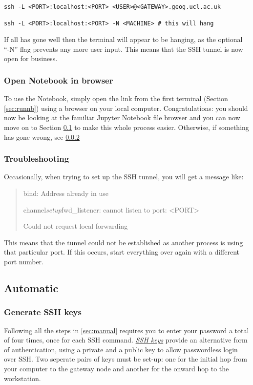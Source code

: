 \documentclass[a4paper]{article}
\begin{document}
\begin{lstlisting}[caption={Tunnel to gateway server}, label={lst:tunnel1}]
ssh -L <PORT>:localhost:<PORT> <USER>@<GATEWAY>.geog.ucl.ac.uk
\end{lstlisting}

\begin{lstlisting}[caption={Tunnel to cluster machine}, label={lst:tunnel2}]
ssh -L <PORT>:localhost:<PORT> -N <MACHINE> # this will hang
\end{lstlisting}

If all has gone well then the terminal will appear to be hanging, as the optional ``-N'' flag prevents any more user input.
This means that the SSH tunnel is now open for business.

\subsubsection{Open Notebook in browser}
\label{sec:opennb}

To use the Notebook, simply open the link from the first terminal (Section \ref{sec:runnb}) using a browser on your local computer. 
Congratulations: you should now be looking at the familiar Jupyter Notebook file browser and you can now move on to Section \ref{sec:auto} to make this whole process easier.
Otherwise, if something has gone wrong, see \ref{sec:trouble} 

\subsubsection{Troubleshooting}
\label{sec:trouble}
Occasionally, when trying to set up the SSH tunnel, you will get a message like:
\begin{quote}
bind: Address already in use

channel\emph{setup}fwd\_listener: cannot listen to port: \textless{}PORT\textgreater{}

Could not request local forwarding
\end{quote}

This means that the tunnel could not be established as another process is using that particular port.
If this occurs, start everything over again with a different port number.

\subsection{Automatic}
\label{sec:auto}

\subsubsection{Generate SSH keys}
\label{sec:sshkeys}
Following all the steps in \ref{sec:manual} requires you to enter your password a total of four times, once for each SSH command.
\href{https://wiki.archlinux.org/index.php/SSH_keys}{\emph{SSH keys}} provide an alternative form of authentication, using a private and a public key to allow passwordless login over SSH.
Two seperate pairs of keys must be set-up: one for the initial hop from your computer to the gateway node and another for the onward hop to the workstation.
\end{document}
